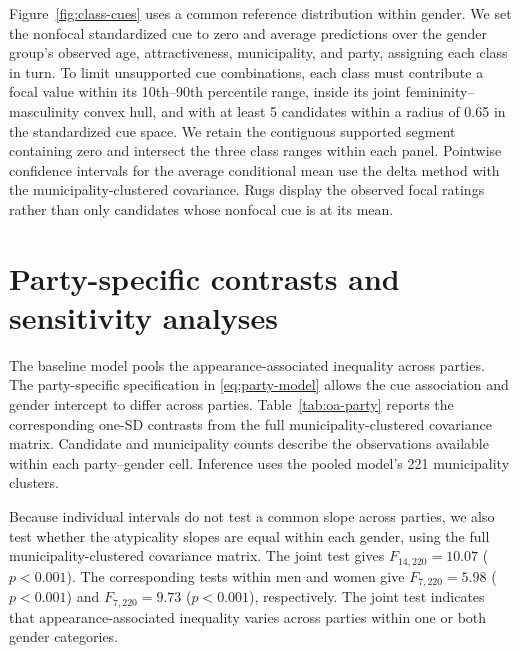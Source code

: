 \documentclass[11pt,a4paper]{article}\usepackage[]{graphicx}\usepackage[]{xcolor}
\begin{document}
Figure~\ref{fig:class-cues} uses a common reference distribution within gender. We set the nonfocal standardized cue to zero and average predictions over the gender group's observed age, attractiveness, municipality, and party, assigning each class in turn. To limit unsupported cue combinations, each class must contribute a focal value within its 10th--90th percentile range, inside its joint femininity--masculinity convex hull, and with at least 5 candidates within a radius of 0.65 in the standardized cue space. We retain the contiguous supported segment containing zero and intersect the three class ranges within each panel. Pointwise confidence intervals for the average conditional mean use the delta method with the municipality-clustered covariance. Rugs display the observed focal ratings rather than only candidates whose nonfocal cue is at its mean.

\FloatBarrier
\section{Party-specific contrasts and sensitivity analyses}
\label{sec:oa-party}
The baseline model pools the appearance-associated inequality across parties. The party-specific specification in \autoref{eq:party-model} allows the cue association and gender intercept to differ across parties. Table~\ref{tab:oa-party} reports the corresponding one-SD contrasts from the full municipality-clustered covariance matrix. Candidate and municipality counts describe the observations available within each party--gender cell. Inference uses the pooled model's 221 municipality clusters.

Because individual intervals do not test a common slope across parties, we also test whether the atypicality slopes are equal within each gender, using the full municipality-clustered covariance matrix. The joint test gives $F_{14,220}=10.07$ ($p<0.001$). The corresponding tests within men and women give $F_{7,220}=5.98$ ($p<0.001$) and $F_{7,220}=9.73$ ($p<0.001$), respectively. The joint test indicates that appearance-associated inequality varies across parties within one or both gender categories.
\end{document}
